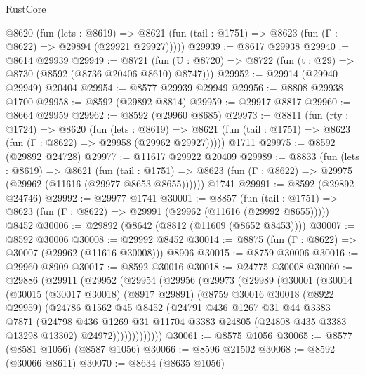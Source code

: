 \begin{lexlean}{RustCore}
\begin{coremodule}
    @8620
      (fun (lets : @8619) =>
      @8621 (fun (tail : @1751) => @8623 (fun (Γ : @8622) => @29894 (@29921 @29927)))))
@29939 := @8617 @29938
@29940 := @8614 @29939
@29949 := @8721
    (fun (U : @8720) => @8722 (fun (t : @29) => @8730 (@8592 (@8736 @20406 @8610) @8747)))
@29952 := @29914 (@29940 @29949) @20404
@29954 := @8577 @29939 @29949
@29956 := @8808 @29938 @1700
@29958 := @8592 (@29892 @8814)
@29959 := @29917 @8817
@29960 := @8664 @29959
@29962 := @8592 (@29960 @8685)
@29973 := @8811
    (fun (rty : @1724) =>
    @8620
      (fun (lets : @8619) =>
      @8621 (fun (tail : @1751) => @8623 (fun (Γ : @8622) => @29958 (@29962 @29927)))))
    @1711
@29975 := @8592 (@29892 @24728)
@29977 := @11617 @29922 @20409
@29989 := @8833
    (fun (lets : @8619) =>
    @8621
      (fun (tail : @1751) =>
      @8623 (fun (Γ : @8622) => @29975 (@29962 (@11616 (@29977 @8653 @8655))))))
    @1741
@29991 := @8592 (@29892 @24746)
@29992 := @29977 @1741
@30001 := @8857
    (fun (tail : @1751) => @8623 (fun (Γ : @8622) => @29991 (@29962 (@11616 (@29992 @8655)))))
    @8452
@30006 := @29892 (@8642 (@8812 (@11609 (@8652 @8453))))
@30007 := @8592 @30006
@30008 := @29992 @8452
@30014 := @8875 (fun (Γ : @8622) => @30007 (@29962 (@11616 @30008))) @8906
@30015 := @8759 @30006
@30016 := @29960 @8909
@30017 := @8592 @30016
@30018 := @24775 @30008
@30060 := @29886
    (@29911
      (@29952
        (@29954
          (@29956
            (@29973
              (@29989
                (@30001
                  (@30014
                    (@30015
                      (@30017 @30018)
                      (@8917 @29891)
                      (@8759
                        @30016
                        @30018
                        (@8922 @29959)
                        (@24786
                          @1562
                          @45
                          @8452
                          (@24791
                            @436
                            @1267
                            @31
                            @44
                            @3383
                            @7871
                            (@24798
                              @436
                              @1269
                              @31
                              @11704
                              @3383
                              @24805
                              (@24808 @435 @3383 @13298 @13302)
                              @24972)))))))))))))
@30061 := @8575 @1056
@30065 := @8577 (@8581 @1056) (@8587 @1056)
@30066 := @8596 @21502
@30068 := @8592 (@30066 @8611)
@30070 := @8634 (@8635 @1056)

\end{coremodule}
\end{lexlean}

